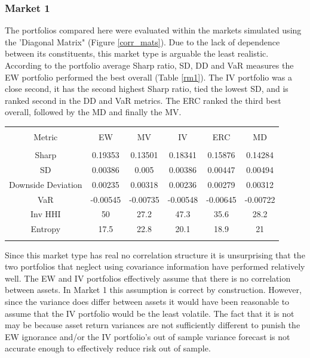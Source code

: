 \documentclass[11pt,preprint, authoryear]{elsarticle}
\let\origtable\table
\let\endorigtable\endtable
\renewenvironment{table}[1][2] {
    \expandafter\origtable\expandafter[H]
} {
    \endorigtable
}
\numberwithin{equation}{section}
\numberwithin{figure}{section}
\numberwithin{table}{section}
\begin{document}
\hypertarget{market-1}{%
\subsubsection{Market 1}\label{market-1}}

The portfolios compared here were evaluated within the markets simulated
using the 'Diagonal Matrix" (Figure \ref{corr_mats}). Due to the lack of
dependence between its constituents, this market type is arguable the
least realistic. According to the portfolio average Sharp ratio, SD, DD
and VaR measures the EW portfolio performed the best overall (Table
\ref{rm1}). The IV portfolio was a close second, it has the second
highest Sharp ratio, tied the lowest SD, and is ranked second in the DD
and VaR metrics. The ERC ranked the third best overall, followed by the
MD and finally the MV.

\begin{table}[!htbp] \centering 
  \caption{Market 1 - Portfolio Risk Metrics} 
  \label{rm1} 
\begin{tabular}{@{\extracolsep{5pt}} cccccc} 
\\[-1.8ex]\hline 
\hline \\[-1.8ex] 
Metric & EW & MV & IV & ERC & MD \\ 
\hline \\[-1.8ex] 
Sharp & 0.19353 & 0.13501 & 0.18341 & 0.15876 & 0.14284 \\ 
SD & 0.00386 & 0.005 & 0.00386 & 0.00447 & 0.00494 \\ 
Downside Deviation & 0.00235 & 0.00318 & 0.00236 & 0.00279 & 0.00312 \\ 
VaR & -0.00545 & -0.00735 & -0.00548 & -0.00645 & -0.00722 \\ 
Inv HHI & 50 & 27.2 & 47.3 & 35.6 & 28.2 \\ 
Entropy & 17.5 & 22.8 & 20.1 & 18.9 & 21 \\ 
\hline \\[-1.8ex] 
\end{tabular} 
\end{table}

Since this market type has real no correlation structure it is
unsurprising that the two portfolios that neglect using covariance
information have performed relatively well. The EW and IV portfolios
effectively assume that there is no correlation between assets. In
Market 1 this assumption is correct by construction. However, since the
variance does differ between assets it would have been reasonable to
assume that the IV portfolio would be the least volatile. The fact that
it is not may be because asset return variances are not sufficiently
different to punish the EW ignorance and/or the IV portfolio's out of
sample variance forecast is not accurate enough to effectively reduce
risk out of sample.
\end{document}
